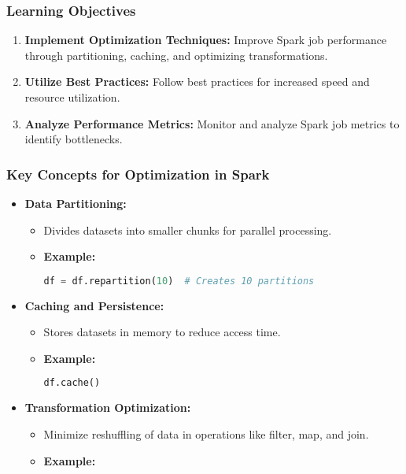 \documentclass[aspectratio=169]{beamer}
\begin{document}
\begin{frame}[fragile]
    \frametitle{Learning Objectives}
    \begin{enumerate}
        \item \textbf{Implement Optimization Techniques:} 
            Improve Spark job performance through partitioning, caching, and optimizing transformations.
        \item \textbf{Utilize Best Practices:} 
            Follow best practices for increased speed and resource utilization.
        \item \textbf{Analyze Performance Metrics:} 
            Monitor and analyze Spark job metrics to identify bottlenecks.
    \end{enumerate}
\end{frame}

\begin{frame}[fragile]
    \frametitle{Key Concepts for Optimization in Spark}
    \begin{itemize}
        \item \textbf{Data Partitioning:}
            \begin{itemize}
                \item Divides datasets into smaller chunks for parallel processing.
                \item \textbf{Example:}
                \begin{lstlisting}[language=Python]
df = df.repartition(10)  # Creates 10 partitions
                \end{lstlisting}
            \end{itemize}
        \item \textbf{Caching and Persistence:}
            \begin{itemize}
                \item Stores datasets in memory to reduce access time.
                \item \textbf{Example:}
                \begin{lstlisting}[language=Python]
df.cache()
                \end{lstlisting}
            \end{itemize}
        \item \textbf{Transformation Optimization:}
            \begin{itemize}
                \item Minimize reshuffling of data in operations like filter, map, and join.
                \item \textbf{Example:}

\end{itemize}
\end{itemize}
\end{frame}
\end{document}
